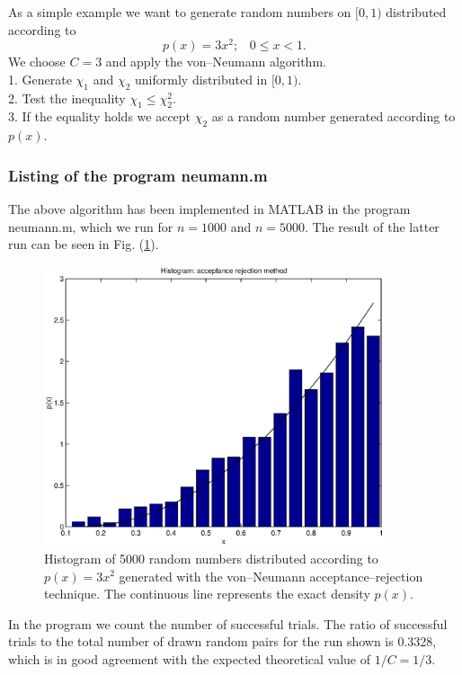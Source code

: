 As a simple example we want to generate random numbers on $[0,1)$    
distributed according to
\begin{equation*}
p(x) = 3x^2; \;\;\; 0 \le x <1.
\end{equation*}
We choose $C=3$ and apply the von--Neumann algorithm. \\
1. Generate $\chi_1$ and $\chi_2$ uniformly distributed in 
    $[0,1)$. \\
2. Test the inequality $\chi_1 \le \chi_2^2.$     \\
3. If the equality holds we accept $\chi_2$ as a random number 
generated according to $p(x)$.

\subsubsection{Listing of the program neumann.m}

The above algorithm has been implemented in MATLAB in the program
{\sf neumann.m}, which we run for $n=1000$ and $n=5000$. The 
result of the latter run can be seen in Fig. (\ref{F_NEUMANN}).
\begin{figure}
\label{F_NEUMANN}
\includegraphics[width=10cm]{./Figures/f_neumann.eps}
\caption{Histogram of 5000 random numbers distributed
according to $p(x) = 3x^2$ generated with the von--Neumann
acceptance--rejection technique.
The continuous line represents the exact density $p(x)$.}
\end{figure}
In the program we count the number of successful trials. The ratio
of successful trials to the total number of drawn random pairs for 
the run shown
is 0.3328, which is in good agreement with the expected theoretical
value of $1/C=1/3$.

